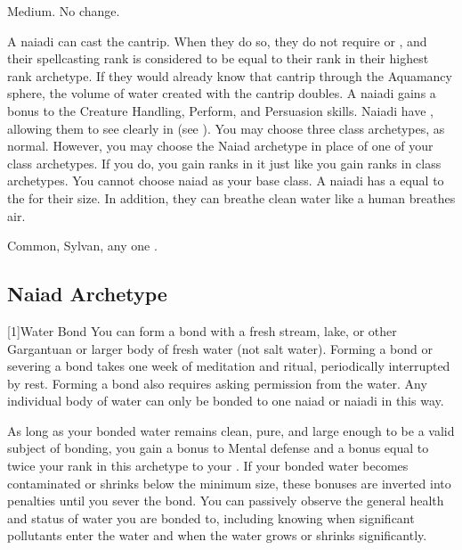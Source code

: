    Medium.
   No change.
  \begin{itemize}
     A naiadi can cast the  cantrip.
      When they do so, they do not require  or , and their spellcasting rank is considered to be equal to their rank in their highest rank archetype.
      If they would already know that cantrip through the Aquamancy sphere, the volume of water created with the cantrip doubles.
     A naiadi gains a  bonus to the Creature Handling, Perform, and Persuasion skills.
     Naiadi have , allowing them to see clearly in  (see ).
     You may choose three class archetypes, as normal.
      However, you may choose the Naiad archetype in place of one of your class archetypes.
      If you do, you gain ranks in it just like you gain ranks in class archetypes.
      You cannot choose naiad as your base class.
     A naiadi has a  equal to the  for their size.
      In addition, they can breathe clean water like a human breathes air.
  \end{itemize}
   Common, Sylvan, any one .

  \subsection{Naiad Archetype}

    [1]{Water Bond} You can form a bond with a fresh stream, lake, or other Gargantuan or larger body of fresh water (not salt water).
    Forming a bond or severing a bond takes one week of meditation and ritual, periodically interrupted by rest.
    Forming a bond also requires asking permission from the water.
    Any individual body of water can only be bonded to one naiad or naiadi in this way.

    As long as your bonded water remains clean, pure, and large enough to be a valid subject of bonding, you gain a  bonus to Mental defense and a bonus equal to twice your rank in this archetype to your .
    If your bonded water becomes contaminated or shrinks below the minimum size, these bonuses are inverted into penalties until you sever the bond.
    You can passively observe the general health and status of water you are bonded to, including knowing when significant pollutants enter the water and when the water grows or shrinks significantly.

